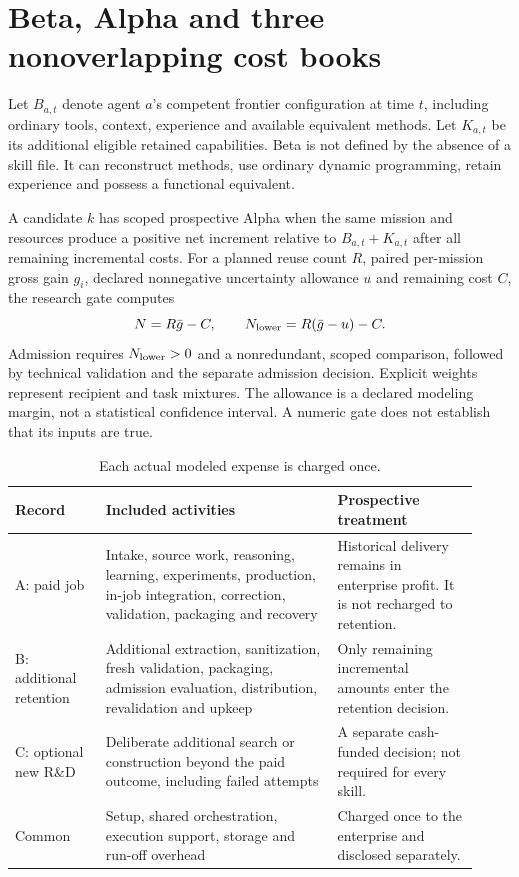 \documentclass[11pt,letterpaper]{article}
\begin{document}
\section{Beta, Alpha and three nonoverlapping cost books}

Let $B_{a,t}$ denote agent $a$'s competent frontier configuration at time $t$,
including ordinary tools, context, experience and available equivalent methods.
Let $K_{a,t}$ be its additional eligible retained capabilities. Beta is not
defined by the absence of a skill file. It can reconstruct methods, use ordinary
dynamic programming, retain experience and possess a functional equivalent.

A candidate $k$ has scoped prospective Alpha when the same mission and resources
produce a positive net increment relative to $B_{a,t}+K_{a,t}$ after all remaining
incremental costs. For a planned reuse count $R$, paired per-mission gross gain
$g_i$, declared nonnegative uncertainty allowance $u$ and remaining cost $C$, the
research gate computes
\begin{equation}
N=R\bar g-C,\qquad N_{\rm lower}=R(\bar g-u)-C.
\label{eq:alpha}
\end{equation}
Admission requires $N_{\rm lower}>0$ and a nonredundant, scoped comparison, followed
by technical validation and the separate admission decision. Explicit weights
represent recipient and task mixtures. The allowance is a declared modeling
margin, not a statistical confidence interval. A numeric gate does not establish
that its inputs are true.

\begin{table}[H]\centering\small
\caption{Each actual modeled expense is charged once.}\label{tab:books}
\begin{tabular}{p{0.18\linewidth}p{0.46\linewidth}p{0.28\linewidth}}\toprule
Record & Included activities & Prospective treatment\\\midrule
A: paid job & Intake, source work, reasoning, learning, experiments, production, in-job integration, correction, validation, packaging and recovery & Historical delivery remains in enterprise profit. It is not recharged to retention.\\
B: additional retention & Additional extraction, sanitization, fresh validation, packaging, admission evaluation, distribution, revalidation and upkeep & Only remaining incremental amounts enter the retention decision.\\
C: optional new R\&D & Deliberate additional search or construction beyond the paid outcome, including failed attempts & A separate cash-funded decision; not required for every skill.\\
Common & Setup, shared orchestration, execution support, storage and run-off overhead & Charged once to the enterprise and disclosed separately.\\\bottomrule
\end{tabular}
\end{table}
\end{document}
